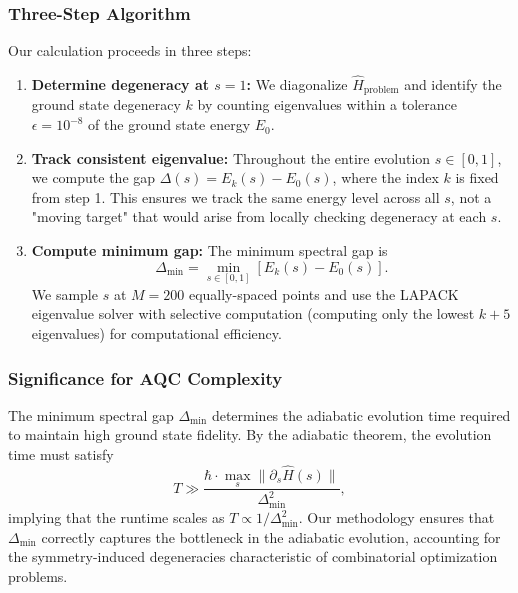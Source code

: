 \subsubsection{Three-Step Algorithm}

Our calculation proceeds in three steps:

\begin{enumerate}
    \item \textbf{Determine degeneracy at $s=1$:} We diagonalize $\hat{H}_{\text{problem}}$ and identify the ground state degeneracy $k$ by counting eigenvalues within a tolerance $\epsilon = 10^{-8}$ of the ground state energy $E_0$.
    
    \item \textbf{Track consistent eigenvalue:} Throughout the entire evolution $s \in [0,1]$, we compute the gap $\Delta(s) = E_k(s) - E_0(s)$, where the index $k$ is fixed from step 1. This ensures we track the same energy level across all $s$, not a "moving target" that would arise from locally checking degeneracy at each $s$.
    
    \item \textbf{Compute minimum gap:} The minimum spectral gap is
    \begin{equation}
        \Delta_{\text{min}} = \min_{s \in [0,1]} \left[ E_k(s) - E_0(s) \right].
    \end{equation}
    We sample $s$ at $M=200$ equally-spaced points and use the LAPACK eigenvalue solver with selective computation (computing only the lowest $k+5$ eigenvalues) for computational efficiency.
\end{enumerate}

\subsubsection{Significance for AQC Complexity}

The minimum spectral gap $\Delta_{\text{min}}$ determines the adiabatic evolution time required to maintain high ground state fidelity. By the adiabatic theorem, the evolution time must satisfy
%
\begin{equation}
    T \gg \frac{\hbar \cdot \max_s \|\partial_s \hat{H}(s)\|}{\Delta_{\text{min}}^2},
\end{equation}
%
implying that the runtime scales as $T \propto 1/\Delta_{\text{min}}^2$. Our methodology ensures that $\Delta_{\text{min}}$ correctly captures the bottleneck in the adiabatic evolution, accounting for the symmetry-induced degeneracies characteristic of combinatorial optimization problems.

